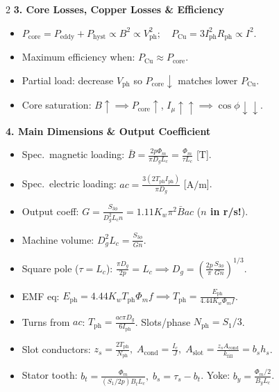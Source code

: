 \begin{multicols}{2}
\textbf{3. Core Losses, Copper Losses \& Efficiency}
\vspace{-0.3em}
\begin{itemize}\setlength{\itemsep}{0pt}\setlength{\parskip}{0pt}
  \item $P_{\mathrm{core}} = P_{\mathrm{eddy}} + P_{\mathrm{hyst}} \propto B^2 \propto V_{\mathrm{ph}}^2;\quad P_{\mathrm{Cu}} = 3 I_{\mathrm{ph}}^2 R_{\mathrm{ph}} \propto I^2$.
  \item Maximum efficiency when: $P_{\mathrm{Cu}} \approx P_{\mathrm{core}}$.
  \item Partial load: decrease $V_{\mathrm{ph}}$ so $P_{\mathrm{core}}\downarrow$ matches lower $P_{\mathrm{Cu}}$.
  \item Core saturation: $B\uparrow \implies P_{\mathrm{core}}\uparrow$, $I_\mu\uparrow\uparrow \implies \cos\phi\downarrow\downarrow$.
\end{itemize}

\textbf{4. Main Dimensions \& Output Coefficient}
\vspace{-0.3em}
\begin{itemize}\setlength{\itemsep}{0pt}\setlength{\parskip}{0pt}
  \item Spec.\ magnetic loading: $\bar{B} = \frac{2p \Phi_m}{\pi D_g L_c} = \frac{\Phi_m}{\tau L_c}$ [$\mathrm{T}$].
  \item Spec.\ electric loading: $ac = \frac{3(2 T_{\mathrm{ph}} I_{\mathrm{ph}})}{\pi D_g}$ [$\mathrm{A/m}$].
  \item Output coeff: $G = \frac{S_{3\phi}}{D_g^2 L_c n} = 1.11 K_w \pi^2 \bar{B} ac$ (\textbf{$n$ in r/s!}).
  \item Machine volume: $D_g^2 L_c = \frac{S_{3\phi}}{G n}$.
  \item Square pole ($\tau = L_c$): $\frac{\pi D_g}{2p} = L_c \implies D_g = \left(\frac{2p}{\pi}\frac{S_{3\phi}}{G n}\right)^{1/3}$.
  \item EMF eq: $E_{\mathrm{ph}} = 4.44 K_w T_{\mathrm{ph}} \Phi_m f \implies T_{\mathrm{ph}} = \frac{E_{\mathrm{ph}}}{4.44 K_w \Phi_m f}$.
  \item Turns from $ac$: $T_{\mathrm{ph}} = \frac{ac \pi D_g}{6 I_{\mathrm{ph}}}$. Slots/phase $N_{\mathrm{ph}} = S_1/3$.
  \item Slot conductors: $z_s = \frac{2 T_{\mathrm{ph}}}{N_{\mathrm{ph}}},\; A_{\mathrm{cond}} = \frac{I_c}{J},\; A_{\mathrm{slot}} = \frac{z_s A_{\mathrm{cond}}}{k_{\mathrm{fill}}} = b_s h_s$.
  \item Stator tooth: $b_t = \frac{\Phi_m}{(S_1/2p) B_t L_c},\; b_s = \tau_s - b_t$. Yoke: $b_y = \frac{\Phi_m/2}{B_y L_c}$.
\end{itemize}


\end{multicols}
